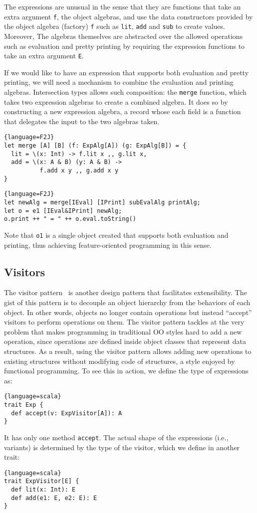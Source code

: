 The expressions are unusual in the sense that they are functions that take an
extra argument \lstinline$f$, the object algebras, and use the data constructors
provided by the object algebra (factory) \lstinline$f$ such as \lstinline$lit$,
\lstinline$add$ and \lstinline$sub$ to create values. Moreover, The algebras
themselves are abstracted over the allowed operations such as evaluation and
pretty printing by requiring the expression functions to take an extra argument
\lstinline$E$.

If we would like to have an expression that supports both evaluation and pretty
printing, we will need a mechanism to combine the evaluation and printing
algebras. Intersection types allows such composition: the \lstinline$merge$
function, which takes two expression algebras to create a combined algebra. It
does so by constructing a new expression algebra, a record whose each field is a
function that delegates the input to the two algebras taken.
\begin{lstlisting}{language=F2J}
let merge [A] [B] (f: ExpAlg[A]) (g: ExpAlg[B]) = {
  lit = \(x: Int) -> f.lit x ,, g.lit x,
  add = \(x: A & B) (y: A & B) ->
          f.add x y ,, g.add x y
}
\end{lstlisting}

\begin{lstlisting}{language=F2J}
let newAlg = merge[IEval] [IPrint] subEvalAlg printAlg;
let o = e1 [IEval&IPrint] newAlg;
o.print ++ " = " ++ o.eval.toString()
\end{lstlisting}
Note that \lstinline$o1$ is a single object created that supports both
evaluation and printing, thus achieving feature-oriented programming in this
sense.

\subsection{Visitors}

The visitor pattern~\cite{gamma1994design} is another design pattern that
facilitates extensibility. The gist of this pattern is to decouple an object
hierarchy from the behaviors of each object. In other words, objects no longer
contain operations but instead ``accept'' visitors to perform operations on
them. The visitor pattern tackles at the very problem that makes programming in
traditional OO styles hard to add a new operation, since operations are defined
inside object classes that represent data structures. As a result, using the
visitor pattern allows adding new operations to existing structures without
modifying code of structures, a style enjoyed by functional programming. To see
this in action, we define the type of expressions as:
\begin{lstlisting}{language=scala}
trait Exp {
  def accept(v: ExpVisitor[A]): A
}
\end{lstlisting}
It has only one method \lstinline$accept$. The actual shape of the expressions
(i.e., variants) is determined by the type of the visitor, which we define in
another trait:
\begin{lstlisting}{language=scala}
trait ExpVisitor[E] {
  def lit(x: Int): E
  def add(e1: E, e2: E): E
}
\end{lstlisting}

